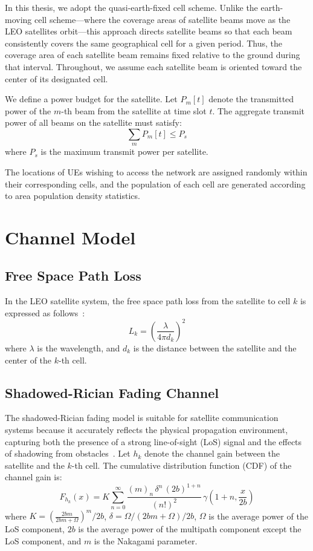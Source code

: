 In this thesis, we adopt the quasi-earth-fixed cell scheme. Unlike the earth-moving cell scheme—where the coverage areas of satellite beams move as the LEO satellites orbit—this approach directs satellite beams so that each beam consistently covers the same geographical cell for a given period. Thus, the coverage area of each satellite beam remains fixed relative to the ground during that interval. Throughout, we assume each satellite beam is oriented toward the center of its designated cell.

We define a power budget for the satellite. Let $P_{m}[t]$ denote the transmitted power of the $m$-th beam from the satellite at time slot $t$. The aggregate transmit power of all beams on the satellite must satisfy:
\begin{equation}
    \sum_{m} P_{m}[t] \leq P_s
\end{equation}
where $P_s$ is the maximum transmit power per satellite.

The locations of UEs wishing to access the network are assigned randomly within their corresponding cells, and the population of each cell are generated according to area population density statistics.

\section{Channel Model}

\subsection{Free Space Path Loss}
In the LEO satellite system, the free space path loss from the satellite to cell $k$ is expressed as follows~\cite{Satellite-Multi-Beam}:
\begin{equation}
    L_{k} = \left(\frac{\lambda}{4\pi d_{k}}\right)^2
\end{equation}
where $\lambda$ is the wavelength, and $d_{k}$ is the distance between the satellite and the center of the $k$-th cell.

\subsection{Shadowed-Rician Fading Channel}
The shadowed-Rician fading model is suitable for satellite communication systems because it accurately reflects the physical propagation environment, capturing both the presence of a strong line-of-sight (LoS) signal and the effects of shadowing from obstacles~\cite{channel-model}. Let $h_{k}$ denote the channel gain between the satellite and the $k$-th cell. The cumulative distribution function (CDF) of the channel gain is:
\begin{equation}
    F_{h_{k}}(x) = K \sum_{n=0}^{\infty} \frac{(m)_n \, \delta^n \, (2b)^{1+n}}{(n!)^2} \, \gamma\left(1+n, \frac{x}{2b}\right)
\end{equation}
where $K = \left(\frac{2bm}{2bm+\Omega}\right)^m/2b$, $\delta = \Omega/(2bm+\Omega)/2b$, $\Omega$ is the average power of the LoS component, $2b$ is the average power of the multipath component except the LoS component, and $m$ is the Nakagami parameter.

